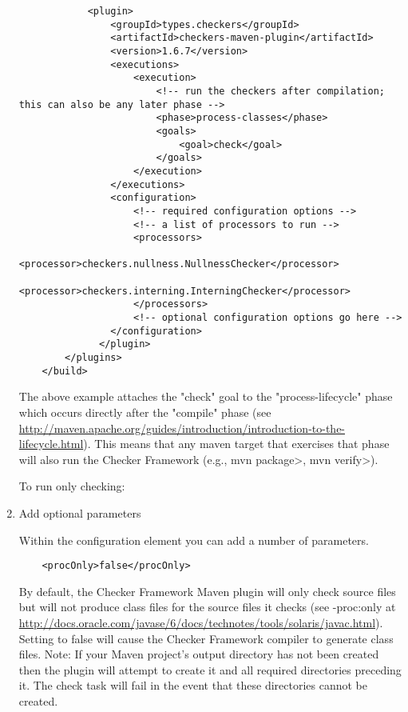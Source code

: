 \begin{enumerate}
\begin{Verbatim}
            <plugin>
                <groupId>types.checkers</groupId>
                <artifactId>checkers-maven-plugin</artifactId>
                <version>1.6.7</version>
                <executions>
                    <execution>
                        <!-- run the checkers after compilation; this can also be any later phase -->
                        <phase>process-classes</phase>
                        <goals>
                            <goal>check</goal>
                        </goals>
                    </execution>
                </executions>
                <configuration>
                    <!-- required configuration options -->
                    <!-- a list of processors to run -->
                    <processors>
                        <processor>checkers.nullness.NullnessChecker</processor>
                        <processor>checkers.interning.InterningChecker</processor>
                    </processors>
                    <!-- optional configuration options go here -->
                </configuration>
              </plugin>
        </plugins>
    </build>
\end{Verbatim}

The above example attaches the "check" goal to the "process-lifecycle" phase which occurs directly after
the "compile" phase (see \url{http://maven.apache.org/guides/introduction/introduction-to-the-lifecycle.html}).
This means that any maven target that exercises that phase will also run the Checker Framework
(e.g., \<mvn package>, \<mvn verify>).

To run only checking:

\item Add optional parameters

Within the configuration element you can add a number of parameters.

\begin{Verbatim}
    <procOnly>false</procOnly>
\end{Verbatim}
By default, the Checker Framework Maven plugin will only check source files but will not produce
class files for the source files it checks (see -proc:only at \url{http://docs.oracle.com/javase/6/docs/technotes/tools/solaris/javac.html}).
Setting  to false will cause the Checker Framework compiler to generate class files.
Note: If your Maven project's output directory has not been created then the plugin will attempt to
create it and all required directories preceding it.  The check task will fail
in the event that these directories cannot be created.


\end{enumerate}
